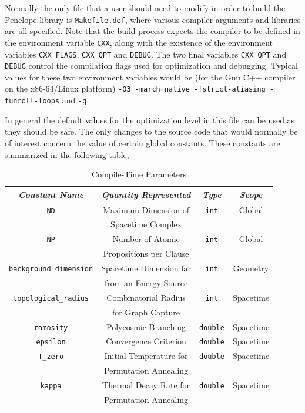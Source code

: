 \documentclass[12pt,letterpaper]{report}
\begin{document}
Normally the only file that a user should need to modify in order to build the Penelope library 
is \texttt{Makefile.def}, where various compiler arguments and libraries are all specified. Note that 
the build process expects the compiler to be defined in the environment variable \texttt{CXX}, along 
with the existence of the environment variables \texttt{CXX\_FLAGS}, \texttt{CXX\_OPT} and \texttt{DEBUG}. 
The two final variables \texttt{CXX\_OPT} and \texttt{DEBUG} control the compilation flags used for 
optimization and debugging. Typical values for these two environment variables would be (for the Gnu 
C++ compiler on the x86-64/Linux platform) \texttt{-O3 -march=native -fstrict-aliasing -funroll-loops} 
and \texttt{-g}.

In general the default values for the optimization level in this file can be used as 
they should be safe. The only changes to the source code that would normally be of interest 
concern the value of certain global constants. These constants are summarized in the following table,
\begin{table}[htbp]
\centering
\begin{tabular}{|c|c|c|c|}
\hline
\emph{Constant Name} & \emph{Quantity Represented} & \emph{Type} & \emph{Scope} \\ \hline
\texttt{ND} & Maximum Dimension of                  & \texttt{int} & Global \\ 
           & Spacetime Complex                     &             &        \\ \hline
\texttt{NP} & Number of Atomic                       & \texttt{int} & Global \\ 
           & Propositions per Clause               &              &         \\ \hline
\texttt{background\_dimension} & Spacetime Dimension far & \texttt{int}  & Geometry \\ 
                              & from an Energy Source    &             &           \\ \hline
\texttt{topological\_radius} & Combinatorial Radius & \texttt{int} & Spacetime \\
                            & for Graph Capture &          &           \\ \hline
\texttt{ramosity} & Polycosmic Branching & \texttt{double} & Spacetime \\ \hline
\texttt{epsilon} & Convergence Criterion & \texttt{double} & Spacetime \\ \hline
\texttt{T\_zero} & Initial Temperature for & \texttt{double} & Spacetime \\
               & Permutation Annealing   &                &           \\ \hline
\texttt{kappa} & Thermal Decay Rate for   & \texttt{double} & Spacetime \\
              & Permutation Annealing    &                &           \\ \hline
\end{tabular}
\caption{Compile-Time Parameters}
\label{ct_parms}
\end{table}
\end{document}
